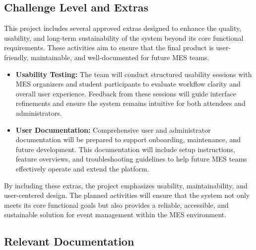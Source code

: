 \documentclass[12pt, titlepage]{article}
\begin{document}
\subsection{Challenge Level and Extras}

This project includes several approved extras designed to enhance the quality, usability, and long-term sustainability of the system beyond its core functional requirements. These activities aim to ensure that the final product is user-friendly, maintainable, and well-documented for future MES teams.

\begin{itemize}
    \item \textbf{Usability Testing:} The team will conduct structured usability sessions with MES organizers and student participants to evaluate workflow clarity and overall user experience. Feedback from these sessions will guide interface refinements and ensure the system remains intuitive for both attendees and administrators.
    \item \textbf{User Documentation:} Comprehensive user and administrator documentation will be prepared to support onboarding, maintenance, and future development. This documentation will include setup instructions, feature overviews, and troubleshooting guidelines to help future MES teams effectively operate and extend the platform.
\end{itemize}

By including these extras, the project emphasizes usability, maintainability, and user-centered design. The planned activities will ensure that the system not only meets its core functional goals but also provides a reliable, accessible, and sustainable solution for event management within the MES environment.
\subsection{Relevant Documentation}


\citet{SRS}

\end{document}
